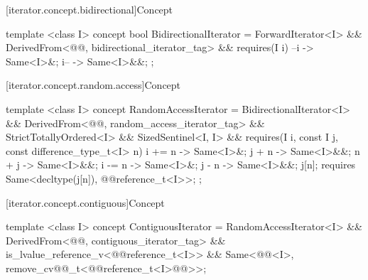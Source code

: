 [iterator.concept.bidirectional]{Concept }


%
\begin{codeblock}
  template <class I>
  concept bool BidirectionalIterator =
    ForwardIterator<I> &&
    DerivedFrom<@@, bidirectional_iterator_tag> &&
    requires(I i) {
      { --i } -> Same<I>&;
      { i-- } -> Same<I>&&;
    };
\end{codeblock}

[iterator.concept.random.access]{Concept }


%
\begin{codeblock}
  template <class I>
  concept RandomAccessIterator =
    BidirectionalIterator<I> &&
    DerivedFrom<@@, random_access_iterator_tag> &&
    StrictTotallyOrdered<I> &&
    SizedSentinel<I, I> &&
    requires(I i, const I j, const difference_type_t<I> n) {
      { i += n } -> Same<I>&;
      { j + n }  -> Same<I>&&;
      { n + j }  -> Same<I>&&;
      { i -= n } -> Same<I>&;
      { j - n }  -> Same<I>&&;
      j[n];
      requires Same<decltype(j[n]), @@reference_t<I>>;
    };
\end{codeblock}

[iterator.concept.contiguous]{Concept }


%
\begin{codeblock}
  template <class I>
  concept ContiguousIterator =
    RandomAccessIterator<I> &&
    DerivedFrom<@@, contiguous_iterator_tag> &&
    is_lvalue_reference_v<@@reference_t<I>> &&
    Same<@@<I>, remove_cv@@_t<@@reference_t<I>@\removed{>}@>>;
\end{codeblock}

